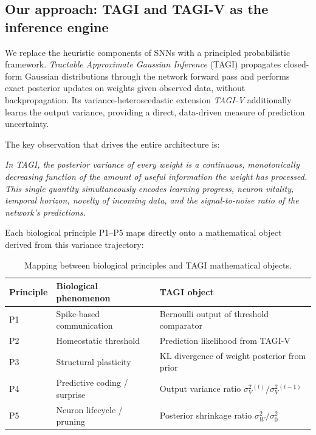 \documentclass[12pt, a4paper]{article}
\newcommand{\sW}{\sigma^{2}_{W}}
\newcommand{\sV}{\sigma^{2}_{V}}
\begin{document}
\subsection{Our approach: TAGI and TAGI-V as the inference engine}

We replace the heuristic components of SNNs with a principled probabilistic framework.
\emph{Tractable Approximate Gaussian Inference} (TAGI) \citep{goulet2021tractable}
propagates closed-form Gaussian distributions through the network forward pass and
performs exact posterior updates on weights given observed data, without backpropagation.
Its variance-heteroscedastic extension \emph{TAGI-V} \citep{nguyen2022tagi} additionally
learns the output variance, providing a direct, data-driven measure of prediction
uncertainty.

The key observation that drives the entire architecture is:

\begin{center}
\textit{In TAGI, the posterior variance of every weight is a continuous, monotonically
decreasing function of the amount of useful information the weight has processed.
This single quantity simultaneously encodes learning progress, neuron vitality, temporal
horizon, novelty of incoming data, and the signal-to-noise ratio of the network's
predictions.}
\end{center}

Each biological principle P1--P5 maps directly onto a mathematical object derived
from this variance trajectory:

\begin{table}[h]
\centering
\renewcommand{\arraystretch}{1.3}
\begin{tabular}{@{}lll@{}}
\toprule
\textbf{Principle} & \textbf{Biological phenomenon} & \textbf{TAGI object} \\
\midrule
P1 & Spike-based communication & Bernoulli output of threshold comparator \\
P2 & Homeostatic threshold & Prediction likelihood from TAGI-V \\
P3 & Structural plasticity & KL divergence of weight posterior from prior \\
P4 & Predictive coding / surprise & Output variance ratio $\sV^{(t)}/\sV^{(t-1)}$ \\
P5 & Neuron lifecycle / pruning & Posterior shrinkage ratio $\sW / \sigma^2_0$ \\
\bottomrule
\end{tabular}
\caption{Mapping between biological principles and TAGI mathematical objects.}
\label{tab:mapping}
\end{table}
\end{document}

